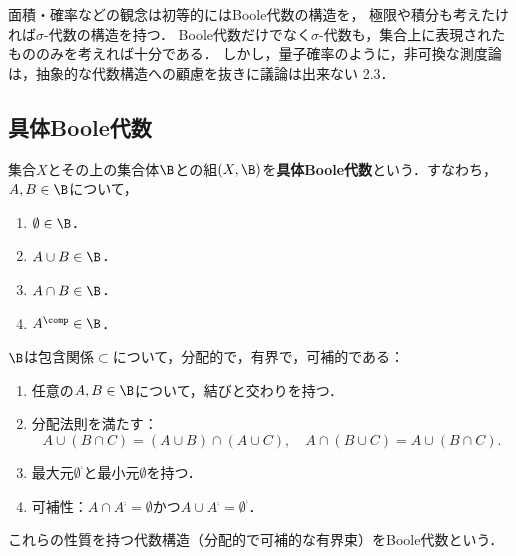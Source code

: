 \documentclass[uplatex, dvipdfmx]{jsreport}
\begin{document}
\begin{tcolorbox}[colframe=ForestGreen, colback=ForestGreen!10!white,breakable,colbacktitle=ForestGreen!40!white,coltitle=black,fonttitle=\bfseries\sffamily,
title=]
    面積・確率などの観念は初等的にはBoole代数の構造を，
    極限や積分も考えたければ$\sigma$-代数の構造を持つ．
    Boole代数だけでなく$\sigma$-代数も，集合上に表現されたもののみを考えれば十分である．
    しかし，量子確率のように，非可換な測度論は，抽象的な代数構造への顧慮を抜きに議論は出来ない\cite{Tao10-AnEpsilonOfRoom} 2.3．
\end{tcolorbox}

\subsection{具体Boole代数}

\begin{definition}
    集合$X$とその上の集合体$\B$との組$(X,\B)$を\textbf{具体Boole代数}という．すなわち，$A,B\in\B$について，
    \begin{enumerate}
        \item $\emptyset\in\B$．
        \item $A\cup B\in\B$．
        \item $A\cap B\in\B$．
        \item $A^\comp\in\B$．
    \end{enumerate}
\end{definition}

\begin{proposition}
    $\B$は包含関係$\subset$について，分配的で，有界で，可補的である：
    \begin{enumerate}
        \item 任意の$A,B\in\B$について，結びと交わりを持つ．
        \item 分配法則を満たす：
        \[A\cup(B\cap C)=(A\cup B)\cap(A\cup C),\quad A\cap(B\cup C)=A\cup(B\cap C).\]
        \item 最大元$\emptyset^\comp$と最小元$\emptyset$を持つ．
        \item 可補性：$A\cap A^\comp=\emptyset$かつ$A\cup A^\comp=\emptyset^\comp$．
    \end{enumerate}
\end{proposition}
\begin{remarks}
    これらの性質を持つ代数構造（分配的で可補的な有界束）をBoole代数という．
\end{remarks}
\end{document}
